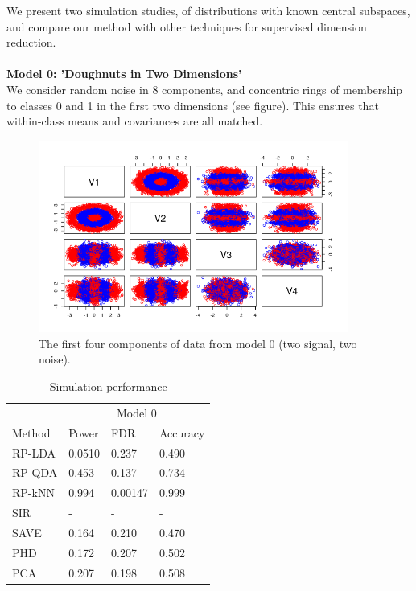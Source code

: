 \documentclass[12pt]{article}
\begin{document}
We present two simulation studies, of distributions with known central subspaces, and compare our method with other techniques for supervised dimension reduction. \\
~\\
\textbf{Model 0: 'Doughnuts in Two Dimensions'} \\
We consider random noise in 8 components, and concentric rings of membership to classes 0 and 1 in the first two dimensions (see figure). This ensures that within-class means and covariances are all matched. \\

\begin{figure}[htbp]
    \centering
    \includegraphics[width=4in]{../results/figures/doughnuts.png}
    \caption{The first four components of data from model 0 (two signal, two noise).\label{fig:doughnuts}}
\end{figure}

\begin{table}
  \caption{Simulation performance}
  \label{sample-table}
  \centering
  \begin{tabular}{l|lll}
    \toprule
    & \multicolumn{3}{c}{Model 0}                  \\
    \cmidrule(r){1-4}
    Method     & Power     & FDR & Accuracy  \\
   
    \cmidrule(r){1-4}
    RP-LDA & 0.0510 & 0.237  &   0.490\\
    RP-QDA & 0.453 & 0.137 &  0.734 \\
    RP-kNN & 0.994  & 0.00147 & 0.999\\
    SIR & - &  - &  -  \\
    SAVE & 0.164 & 0.210 & 0.470 \\
    PHD & 0.172 & 0.207 &     0.502 \\
    PCA & 0.207 & 0.198 & 0.508 \\
    \bottomrule
  \end{tabular}
\end{table}
\end{document}
